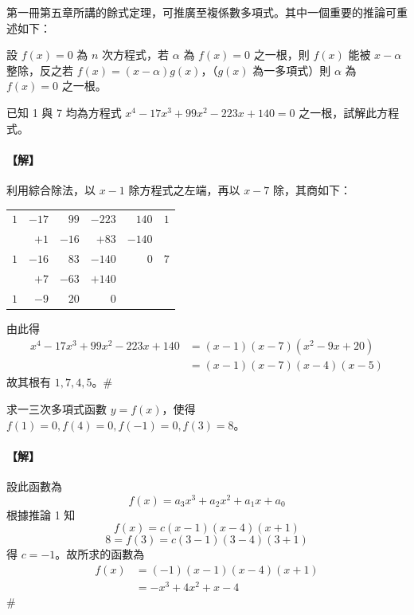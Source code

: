 第一冊第五章所講的餘式定理，可推廣至複係數多項式。其中一個重要的推論可重述如下：

\begin{corollary}[因式定理]\label{cor:b6s-2-1}
設 $f(x)=0$ 為 $n$ 次方程式，若 $\alpha$ 為 $f(x)=0$ 之一根，則 $f(x)$ 能被 $x-\alpha$ 整除，反之若 $f(x) = (x-\alpha)g(x)$，（$g(x)$ 為一多項式）則 $\alpha$ 為 $f(x)=0$ 之一根。
\end{corollary}

\begin{example}\label{ex:b6s-2-1}
已知 1 與 7 均為方程式 $x^4 - 17x^3 + 99x^2 - 223x + 140 = 0$ 之一根，試解此方程式。
\end{example}

\paragraph{【解】}
利用綜合除法，以 $x-1$ 除方程式之左端，再以 $x-7$ 除，其商如下：
\begin{center}
\renewcommand{\arraystretch}{1.2}
\begin{tabular}{rrrrr|r}
$1$ & $-17$ & $99$ & $-223$ & $140$ & $1$ \\
    & $+1$  & $-16$ & $+83$ & $-140$ & \\
\hline
$1$ & $-16$ & $83$ & $-140$ & $0$ & $7$ \\
    & $+7$  & $-63$ & $+140$ & & \\
\hline
$1$ & $-9$  & $20$ & $0$ & &
\end{tabular}
\end{center}
由此得
\begin{align*}
x^4 - 17x^3 + 99x^2 - 223x + 140 &= (x-1)(x-7)(x^2 - 9x + 20) \\
&= (x-1)(x-7)(x-4)(x-5)
\end{align*}
故其根有 $1, 7, 4, 5$。\hfill$\#$

\begin{example}\label{ex:b6s-2-2}
求一三次多項式函數 $y=f(x)$，使得 $f(1)=0, f(4)=0, f(-1)=0, f(3)=8$。
\end{example}

\paragraph{【解】}
設此函數為
\begin{equation}
f(x) = a_3 x^3 + a_2 x^2 + a_1 x + a_0 \label{eq:b6s-2-1-1}
\end{equation}
根據推論 1 知
\begin{equation}
f(x) = c(x-1)(x-4)(x+1) \label{eq:b6s-2-1-2}
\end{equation}
\[ 8 = f(3) = c(3-1)(3-4)(3+1) \]
得 $c = -1$。故所求的函數為
\begin{align*}
f(x) &= (-1)(x-1)(x-4)(x+1) \\
&= -x^3 + 4x^2 + x - 4
\end{align*}
\hfill$\#$

